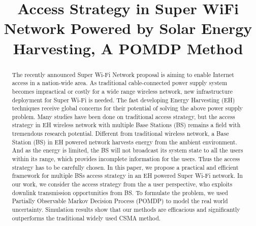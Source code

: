 \documentclass[conference]{IEEEtran}
\begin{document}
\title{Access Strategy in Super WiFi Network Powered by Solar Energy Harvesting, A POMDP Method}

\author{
	\small{}}
\maketitle

\begin{abstract}
The recently announced Super Wi-Fi Network proposal is aiming to enable Internet access in a nation-wide area.
As traditional cable-connected power supply system becomes impractical or costly for a wide range wireless network,
new infrastructure deployment for Super Wi-Fi is needed.
The fast developing Energy Harvesting (EH) techniques receive global 
concerns for their potential of solving the above power supply problem. 
Many studies have been done on traditional access strategy,
but the access strategy in EH wireless network with multiple Base Stations (BS)
remains a field with tremendous research potential.
Different from traditional wireless network,
a Base Station (BS) in EH powered network harvests energy from the ambient environment.
And as the energy is limited, 
the BS will not broadcast its system state to all the users within its range,
which provides incomplete information for the users. 
Thus the access strategy has to be carefully chosen.
In this paper, we propose a practical and efficient framework for multiple BSs access strategy
in an EH powered Super Wi-Fi network.
In our work, we consider the access strategy from the a user perspective,
who exploits downlink transmission opportunities from BS.
To formulate the problem,
we used Partially Observable Markov Decision Process (POMDP) to model the
real world uncertainty.
Simulation results show that our methods are efficacious and significantly outperforms
the traditional widely used CSMA method.
\end{abstract}
\IEEEpeerreviewmaketitle
\end{document}
